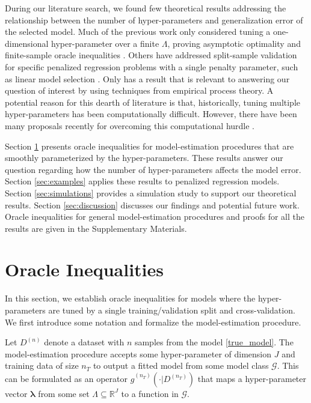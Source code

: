 \documentclass[12pt]{article} %
\theoremstyle{definition}
\begin{document}
During our literature search, we found few theoretical results addressing the relationship between the number of hyper-parameters and generalization error of the selected model. 
Much of the previous work only considered tuning a one-dimensional hyper-parameter over a finite $\Lambda$, proving asymptotic optimality \citep{van2004asymptotic} and finite-sample oracle inequalities \citep{van2003unified, gyorfi2006distribution}. Others have addressed split-sample validation for specific penalized regression problems with a single penalty parameter, such as linear model selection \citep{li1987asymptotic, shao1997asymptotic, golub1979generalized, chetverikov2016cross, chatterjee2015prediction}. Only \citet{lecue2012oracle} has a result that is relevant to answering our question of interest by using techniques from empirical process theory. A potential reason for this dearth of literature is that, historically, tuning multiple hyper-parameters has been computationally difficult. However, there have been many proposals recently for overcoming this computational hurdle \citep{bengio2000gradient, foo2008efficient, snoek2012practical}.

Section \ref{sec:main_results} presents oracle inequalities for model-estimation procedures that are smoothly parameterized by the hyper-parameters. These results answer our question regarding how the number of hyper-parameters affects the model error.
Section \ref{sec:examples} applies these results to penalized regression models.
Section \ref{sec:simulations} provides a simulation study to support our theoretical results.
Section \ref{sec:discussion} discusses our findings and potential future work.
Oracle inequalities for general model-estimation procedures and proofs for all the results are given in the Supplementary Materials.



\section{Oracle Inequalities} \label{sec:main_results}

In this section, we establish oracle inequalities for models where the hyper-parameters are tuned by a single training/validation split and cross-validation. We first introduce some notation and formalize the model-estimation procedure. 

Let $D^{(n)}$ denote a dataset with $n$ samples from the model \eqref{true_model}. The model-estimation procedure accepts some hyper-parameter of dimension $J$ and training data of size $n_T$ to output a fitted model from some model class $\mathcal{G}$. This can be formulated as an operator $\hat{g}^{(n_T)}(\cdot | D^{(n_T)})$ that maps a hyper-parameter vector $\boldsymbol{\lambda}$ from some set $\Lambda \subseteq \mathbb{R}^J$ to a function in $\mathcal{G}$.
\end{document}
